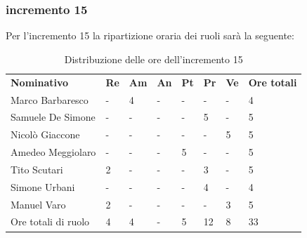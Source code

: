 \subsubsection{incremento 15}
Per l'incremento 15 la ripartizione oraria dei ruoli sarà la seguente:
\begin{center}
    \begin{table}[ht!]
        \centering
        \caption{Distribuzione delle ore dell'incremento 15}
        \vspace{5px}
        \renewcommand{\arraystretch}{1.8}
        \begin{tabular}{p{100px} p{20px} p{20px} p{20px} p{20px} p{20px} p{20px} p{50px} }
            \rowcolor{logo!70} \textbf{Nominativo} & \textbf{Re} & \textbf{Am} & \textbf{An} & \textbf{Pt} & \textbf{Pr} & \textbf{Ve} & \textbf{Ore totali} \\
            Marco Barbaresco                       & -           & 4           & -           & -           & -           & -           & 4                   \\
            Samuele De Simone                      & -           & -           & -           & -           & 5           & -           & 5                   \\
            Nicolò Giaccone                        & -           & -           & -           & -           & -           & 5           & 5                   \\
            Amedeo Meggiolaro                      & -           & -           & -           & 5           & -           & -           & 5                   \\
            Tito Scutari                           & 2           & -           & -           & -           & 3           & -           & 5                   \\
            Simone Urbani                          & -           & -           & -           & -           & 4           & -           & 4                   \\
            Manuel Varo                            & 2           & -           & -           & -           & -           & 3           & 5                   \\
            Ore totali di ruolo                    & 4           & 4           & -           & 5           & 12          & 8           & 33                  \\
        \end{tabular}
    \end{table}
\end{center}
